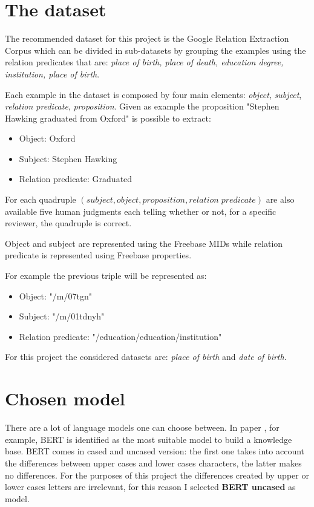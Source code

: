 \documentclass{article}
\begin{document}
\section{The dataset}
\label{Dataset}
The recommended dataset for this project is the Google Relation Extraction Corpus which can be divided in sub-datasets by grouping the examples using the relation predicates that are: \textit{place of birth, place of death, education degree, institution, place of birth}.

Each example in the dataset is composed by four main elements: \textit{object}, \textit{subject}, \textit{relation predicate}, \textit{proposition}. Given as example the proposition "Stephen Hawking graduated from Oxford" is possible to extract:
 
\begin{itemize}
    \item Object: Oxford 
    \item Subject: Stephen Hawking
    \item Relation predicate: Graduated
\end{itemize}
For each quadruple $(subject,object,proposition,relation\;predicate)$ are also available five human judgments each telling whether or not, for a specific reviewer, the quadruple is correct.

Object and subject are represented using the Freebase MIDs while relation predicate is represented using Freebase properties. 

For example the previous triple will be represented as:
\begin{itemize}
    \item Object: "/m/07tgn"
    \item Subject: "/m/01tdnyh"
    \item Relation predicate: "/education/education/institution"
\end{itemize}

For this project the considered datasets are: \textit{place of birth} and \textit{date of birth}.

\section{Chosen model}
\label{chapter: chosen model}
There are a lot of language models one can choose between. In paper \cite{petroni2019language} ,  for example, BERT is identified as the most suitable model to build a knowledge base. BERT comes in cased and uncased version: the first one takes into account the differences between upper cases and lower cases characters, the latter makes no differences. For the purposes of this project the differences created by upper or lower cases letters are irrelevant, for this reason I selected \textbf{BERT uncased} as model.
\end{document}
